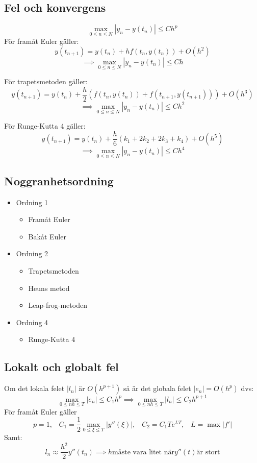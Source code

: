 \documentclass[a4paper,11pt]{article}
\begin{document}
\subsection{Fel och konvergens}
\[
\max_{0 \leq n \leq N} |y_n - y(t_n)| \leq Ch^p
\]
För framåt Euler gäller:
\[
y(t_{n+1}) = y(t_n) + hf(t_n, y(t_n)) + O(h^2)
\]
$$\implies \max_{0 \leq n \leq N} |y_n - y(t_n)| \leq Ch$$

För trapetsmetoden gäller:
\[
y(t_{n+1}) = y(t_n) + \frac{h}{2}(f(t_n, y(t_n)) + f(t_{n+1}, y(t_{n+1}))) + O(h^3)
\]
$$\implies \max_{0 \leq n \leq N} |y_n - y(t_n)| \leq Ch^2$$

För Runge-Kutta 4 gäller:
\[
y(t_{n+1}) = y(t_n) + \frac{h}{6}(k_1 + 2k_2 + 2k_3 + k_4) + O(h^5)
\]
$$\implies \max_{0 \leq n \leq N} |y_n - y(t_n)| \leq Ch^4$$

\subsection{Noggranhetsordning}
\begin{itemize}
    \item Ordning 1
    \begin{itemize}
        \item Framåt Euler
        \item Bakåt Euler
    \end{itemize}
    \item Ordning 2
    \begin{itemize}
        \item Trapetsmetoden
        \item Heuns metod
        \item Leap-frog-metoden
    \end{itemize}
    \item Ordning 4
    \begin{itemize}
        \item Runge-Kutta 4
    \end{itemize}
\end{itemize}

\subsection{Lokalt och globalt fel}
Om det lokala felet $|l_n|$ är $O(h^{p+1})$ så är det globala felet $|e_n| = O(h^p)$ dvs:
\[
\max_{0 \leq nh \leq T} |e_n| \leq C_1h^p \implies \max_{0 \leq nh \leq T} |l_n| \leq C_2h^{p+1}
\]
För framåt Euler gäller
\[
p=1, \hspace{10pt} C_1 = \frac{1}{2} \max_{0 \leq \xi \leq T} |y''(\xi)|, \hspace{10pt} C_2 = C_1 Te^{LT}, \hspace{10pt} L = \max |f'|
\]
Samt:
\[
l_n \approx \frac{h^2}{2} y''(t_n) \implies h \text{måste vara litet när} y''(t) \text{är stort}
\]
\end{document}
